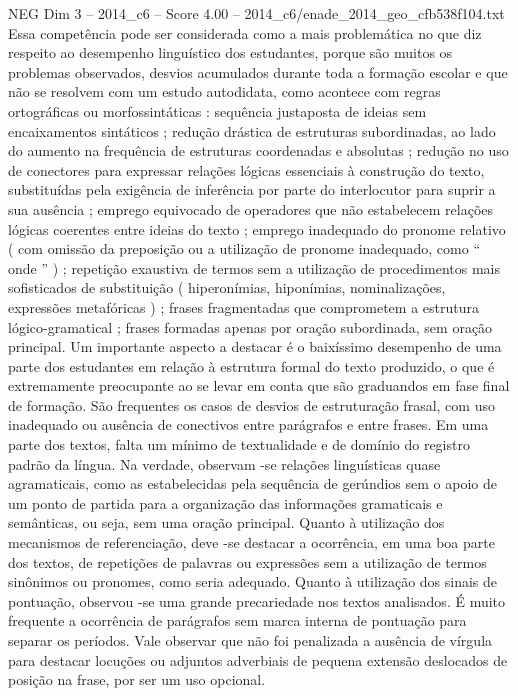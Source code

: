 \begin{textsample}{NEG Dim 3 – 2014\_c6 – Score 4.00 – 2014\_c6/enade\_2014\_geo\_cfb538f104.txt}
Essa competência pode ser considerada como a mais problemática no que diz respeito ao desempenho linguístico dos estudantes, porque são muitos os problemas observados, desvios acumulados durante toda a formação escolar e que não se resolvem com um estudo autodidata, como acontece com regras ortográficas ou morfossintáticas : sequência justaposta de ideias sem encaixamentos sintáticos ; redução drástica de estruturas subordinadas, ao lado do aumento na frequência de estruturas coordenadas e absolutas ; redução no uso de conectores para expressar relações lógicas essenciais à construção do texto, substituídas pela exigência de inferência por parte do interlocutor para suprir a sua ausência ; emprego equivocado de operadores que não estabelecem relações lógicas coerentes entre ideias do texto ; emprego inadequado do pronome relativo ( com omissão da preposição ou a utilização de pronome inadequado, como “ onde ” ) ; repetição exaustiva de termos sem a utilização de procedimentos mais sofisticados de substituição ( hiperonímias, hiponímias, nominalizações, expressões metafóricas ) ; frases fragmentadas que comprometem a estrutura lógico-gramatical ; frases formadas apenas por oração subordinada, sem oração principal.
Um importante aspecto a destacar é o baixíssimo desempenho de uma parte dos estudantes em relação à estrutura formal do texto produzido, o que é extremamente preocupante ao se levar em conta que são graduandos em fase final de formação.
São frequentes os casos de desvios de estruturação frasal, com uso inadequado ou ausência de conectivos entre parágrafos e entre frases.
Em uma parte dos textos, falta um mínimo de textualidade e de domínio do registro padrão da língua.
Na verdade, observam -se relações linguísticas quase agramaticais, como as estabelecidas pela sequência de gerúndios sem o apoio de um ponto de partida para a organização das informações gramaticais e semânticas, ou seja, sem uma oração principal.
Quanto à utilização dos mecanismos de referenciação, deve -se destacar a ocorrência, em uma boa parte dos textos, de repetições de palavras ou expressões sem a utilização de termos sinônimos ou pronomes, como seria adequado.
Quanto à utilização dos sinais de pontuação, observou -se uma grande precariedade nos textos analisados.
É muito frequente a ocorrência de parágrafos sem marca interna de pontuação para separar os períodos.
Vale observar que não foi penalizada a ausência de vírgula para destacar locuções ou adjuntos adverbiais de pequena extensão deslocados de posição na frase, por ser um uso opcional.

\end{textsample}
